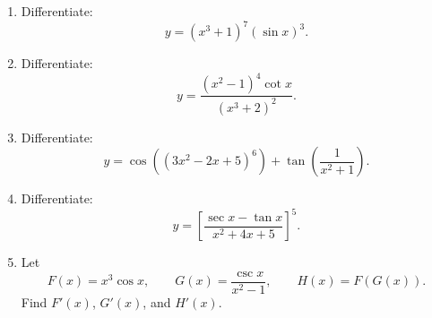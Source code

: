\documentclass[12pt]{article}
\begin{document}
\begin{enumerate}[leftmargin=*, itemsep=1em, topsep=0.8em]
  \item Differentiate:
  \[
  y=(x^3+1)^7(\sin x)^3.
  \]

  \item Differentiate:
  \[
  y=\frac{(x^2-1)^4\cot x}{(x^3+2)^2}.
  \]

  \item Differentiate:
  \[
  y=\cos\!\left((3x^2-2x+5)^6\right)+\tan\!\left(\frac{1}{x^2+1}\right).
  \]

  \item Differentiate:
  \[
  y=\left[\frac{\sec x-\tan x}{x^2+4x+5}\right]^5.
  \]

  \item Let
  \[
  F(x)=x^3\cos x,\qquad G(x)=\frac{\csc x}{x^2-1},\qquad H(x)=F(G(x)).
  \]
  Find $F'(x)$, $G'(x)$, and $H'(x)$.
\end{enumerate}
\end{document}
